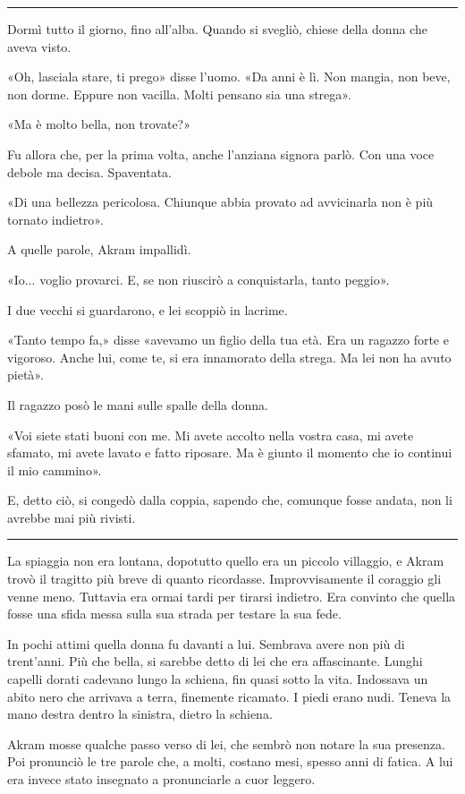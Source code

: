 \documentclass[a4paper,10pt]{memoir}
\begin{document}
\plainbreak{1}

Dormì tutto il giorno, fino all'alba. Quando si svegliò, chiese della donna che aveva visto.

«Oh, lasciala stare, ti prego» disse l'uomo. «Da anni è lì. Non mangia, non beve, non dorme. Eppure non vacilla. Molti
pensano sia una strega».

«Ma è molto bella, non trovate?»

Fu allora che, per la prima volta, anche l'anziana signora parlò. Con una voce debole ma decisa. Spaventata.

«Di una bellezza pericolosa. Chiunque abbia provato ad avvicinarla non è più tornato indietro».

A quelle parole, Akram impallidì.

«Io... voglio provarci. E, se non riuscirò a conquistarla, tanto peggio».

I due vecchi si guardarono, e lei scoppiò in lacrime.

«Tanto tempo fa,» disse «avevamo un figlio della tua età. Era un ragazzo forte e vigoroso. Anche lui, come te, si era
innamorato della strega. Ma lei non ha avuto pietà».

Il ragazzo posò le mani sulle spalle della donna.

«Voi siete stati buoni con me. Mi avete accolto nella vostra casa, mi avete sfamato, mi avete lavato e fatto riposare.
Ma è giunto il momento che io continui il mio cammino».

E, detto ciò, si congedò dalla coppia, sapendo che, comunque fosse andata, non li avrebbe mai più rivisti.

\plainbreak{1}

La spiaggia non era lontana, dopotutto quello era un piccolo villaggio, e Akram trovò il tragitto più breve di quanto
ricordasse. Improvvisamente il coraggio gli venne meno. Tuttavia era ormai tardi per tirarsi indietro. Era convinto che
quella fosse una sfida messa sulla sua strada per testare la sua fede.

In pochi attimi quella donna fu davanti a lui. Sembrava avere non più di trent'anni. Più che bella, si sarebbe detto di
lei che era affascinante. Lunghi capelli dorati cadevano lungo la schiena, fin quasi sotto la vita. Indossava un abito
nero che arrivava a terra, finemente ricamato. I piedi erano nudi. Teneva la mano destra dentro la sinistra, dietro la
schiena.

Akram mosse qualche passo verso di lei, che sembrò non notare la sua presenza. Poi pronunciò le tre parole che, a molti,
costano mesi, spesso anni di fatica. A lui era invece stato insegnato a pronunciarle a cuor leggero.
\end{document}
